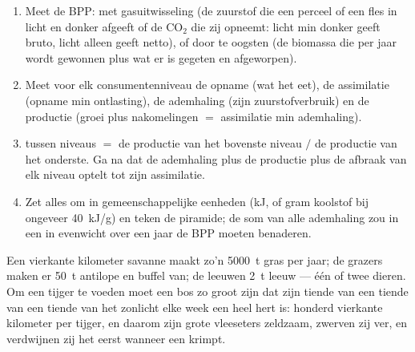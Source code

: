 \begin{method}\label{met:b1:ecosystem-organization:budget}
\begin{enumerate}
  \item Meet de BPP: met gasuitwisseling (de zuurstof die een perceel of
        een fles in licht en donker afgeeft of de $\mathrm{CO_2}$ die zij
        opneemt: licht min donker geeft bruto, licht alleen geeft netto),
        of door te oogsten (de biomassa die per jaar wordt gewonnen plus
        wat er is gegeten en afgeworpen).
  \item Meet voor elk consumentenniveau de opname (wat het eet), de
        assimilatie (opname min ontlasting), de ademhaling (zijn
        zuurstofverbruik) en de productie (groei plus nakomelingen $=$
        assimilatie min ademhaling).
  \item {} tussen niveaus $=$ de productie van het
        bovenste niveau $/$ de productie van het onderste. Ga na dat de
        ademhaling plus de productie plus de afbraak van elk niveau
        optelt tot zijn assimilatie.
  \item Zet alles om in gemeenschappelijke eenheden (\unit{kJ}, of gram
        koolstof bij ongeveer \qty{40}{kJ/g}) en teken de piramide; de som
        van alle ademhaling zou in een  in evenwicht over een
        jaar de BPP moeten benaderen.
\end{enumerate}
\end{method}

\begin{example}\label{ex:b1:ecosystem-organization:top}
Een vierkante kilometer savanne maakt zo'n \qty{5000}{t} gras per jaar; de
grazers maken er \qty{50}{t} antilope en buffel van; de leeuwen \qty{2}{t}
leeuw --- één of twee dieren. Om een tijger te voeden moet een bos zo groot
zijn dat zijn tiende van een tiende van een tiende van het zonlicht elke week
een heel hert is: honderd vierkante kilometer per tijger, en daarom zijn
grote vleeseters zeldzaam, zwerven zij ver, en verdwijnen zij het eerst
wanneer een  krimpt.
\end{example}


